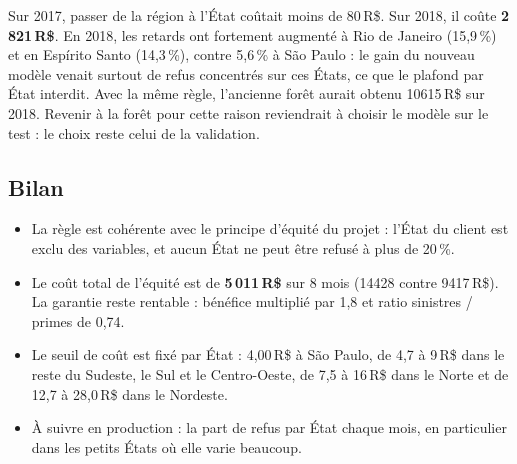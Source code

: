 \documentclass[11pt,a4paper]{article}
\newcommand{\RS}{\,R\$}
\begin{document}
\begin{encadre}[colframe=prudence, title=Pourquoi l'écart avec la validation]
Sur 2017, passer de la région à l'État coûtait moins de 80\RS{}. Sur 2018, il coûte
\textbf{2\,821\RS{}}. En 2018, les retards ont fortement augmenté à Rio de Janeiro (15,9\,\%)
et en Espírito Santo (14,3\,\%), contre 5,6\,\% à São Paulo : le gain du nouveau modèle venait
surtout de refus concentrés sur ces États, ce que le plafond par État interdit. Avec la même
règle, l'ancienne forêt aurait obtenu \num{10615}\RS{} sur 2018. Revenir à la forêt pour cette
raison reviendrait à choisir le modèle sur le test : le choix reste celui de la validation.
\end{encadre}

\subsection{Bilan}

\begin{itemize}
  \item La règle est cohérente avec le principe d'équité du projet : l'État du client est exclu
        des variables, et aucun État ne peut être refusé à plus de 20\,\%.
  \item Le coût total de l'équité est de \textbf{5\,011\RS{}} sur 8 mois (\num{14428}
        contre \num{9417}\RS{}). La garantie reste rentable : bénéfice multiplié par 1,8 et
        ratio sinistres / primes de 0,74.
  \item Le seuil de coût est fixé par État : 4,00\RS{} à São Paulo, de 4,7 à 9\RS{} dans le reste
        du Sudeste, le Sul et le Centro-Oeste, de 7,5 à 16\RS{} dans le Norte et de 12,7 à
        28,0\RS{} dans le Nordeste.
  \item À suivre en production : la part de refus par État chaque mois, en particulier dans les
        petits États où elle varie beaucoup.
\end{itemize}
\end{document}
